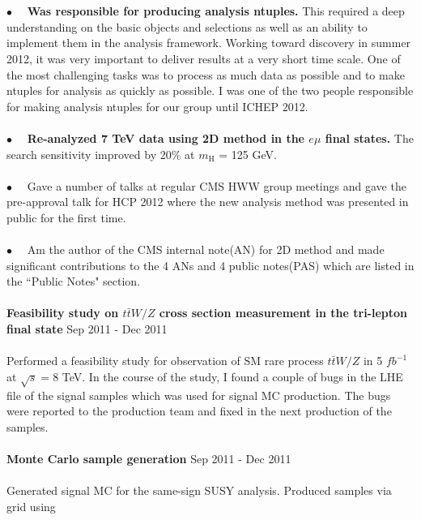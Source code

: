 \documentclass[margin]{res}
\begin{document}
\begin{resume}
    \\
    \\
    $\bullet\quad$  \textbf{Was responsible for producing analysis ntuples. }
      This required a deep understanding on the basic objects and selections 
      as well as an ability to implement them in the analysis framework.
      Working toward discovery in summer 2012, 
      it was very important to deliver results at a very short time scale. One of the most 
      challenging tasks was to process as much data as possible and to make ntuples 
      for analysis as quickly as possible. I was one of the two people responsible for 
      making analysis ntuples for our group until ICHEP 2012. 
    \\    
    \\
    $\bullet\quad$  \textbf{Re-analyzed 7 TeV data using 2D method in the $e\mu$ final states.} 
    The search sensitivity improved by 20\% at $m_{\mathrm{H}}$ = 125 GeV.  
    \\  
    \\
    $\bullet\quad$  Gave a number of talks at regular CMS HWW group meetings 
      and gave the pre-approval talk for HCP 2012 where  
      the new analysis method was presented in public for the first time.
    \\
    \\
    $\bullet\quad$  Am the author of the CMS internal note(AN) for 2D method and 
    made significant contributions to the 4 ANs and 4 public notes(PAS) which are 
    listed in the ``Public Notes" section.   
    \\
    \\
\textbf{Feasibility study on $t\bar{t}W/Z$ cross section measurement in the tri-lepton final state} 
        \hfill Sep 2011 - Dec 2011 
     \\
     \\
     Performed a feasibility study for observation of SM rare process $t\bar{t}W/Z$ 
     in 5 $fb^{-1}$ at $\sqrt{s}=8$ TeV.  
     In the course of the study, I found a couple of bugs in the LHE file of the signal samples 
     which was used for signal MC production. The bugs were reported to the production team 
     and fixed in the next production of the samples.
     \\
     \\
\textbf{Monte Carlo sample generation} 
       \hfill Sep 2011 - Dec 2011 
     \\                
     \\                
     Generated signal MC for the same-sign SUSY analysis. Produced samples via grid using 

\end{resume}
\end{document}
